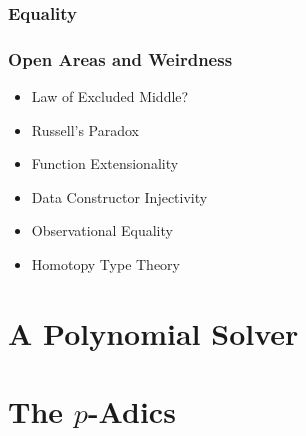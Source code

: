 \documentclass[usenames,dvipsnames]{beamer}
\begin{document}
\begin{frame}
  \frametitle{Equality}
  \pause
\end{frame}
\begin{frame}
  \frametitle{Open Areas and Weirdness}
  \begin{itemize}
    \item Law of Excluded Middle?
    \item Russell's Paradox
    \item Function Extensionality
    \item Data Constructor Injectivity
    \item Observational Equality
    \item Homotopy Type Theory
  \end{itemize}
\end{frame}
\section{A Polynomial Solver}
\section{The \(p\)-Adics}
\end{document}
